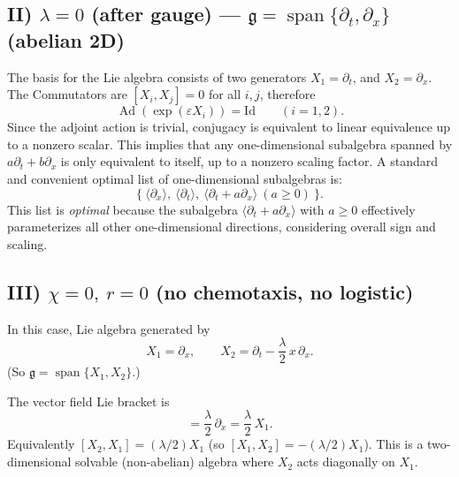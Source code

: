 \documentclass{article}
\begin{document}
\subsection*{II)  $\lambda=0$ (after gauge) — $\mathfrak g=\operatorname{span}\{\partial_t,\partial_x\}$ (abelian 2D)}
The basis for the Lie algebra consists of two generators $X_1=\partial_t$, and $X_2=\partial_x$. The Commutators are $[X_i,X_j]=0$ for all $i,j$, therefore
\begin{equation*}
\operatorname{Ad}(\exp(\varepsilon X_i))=\mathrm{Id}\qquad(i=1,2).
\end{equation*}
Since the adjoint action is trivial, conjugacy is equivalent to linear equivalence up to a nonzero scalar. This implies that any one-dimensional subalgebra spanned by $a\partial_t+b\partial_x$ is only equivalent to itself, up to a nonzero scaling factor. A standard and convenient optimal list of one-dimensional subalgebras is:
\begin{equation*}
\{\ \langle\partial_x\rangle,\ \langle\partial_t\rangle,\ \langle\partial_t + a\partial_x\rangle\ (a\ge 0)\ \}.
\end{equation*}
This list is \textit{optimal} because the subalgebra $\langle\partial_t + a\partial_x\rangle$ with $a\ge0$ effectively parameterizes all other one-dimensional directions, considering overall sign and scaling.
\par 
\subsection*{III) $\chi=0,\ r=0$ (no chemotaxis, no logistic)}
In this case, Lie algebra generated by
\begin{equation*}
X_1=\partial_x,\qquad X_2=\partial_t - \frac{\lambda}{2}\,x\,\partial_x.
\end{equation*}
(So $\mathfrak g=\operatorname{span}\{X_1,X_2\}$.)
\par 
The vector field Lie bracket is
\begin{equation*}
[X_2,X_1] = \frac{\lambda}{2}\,\partial_x = \frac{\lambda}{2}\,X_1.
\end{equation*}
Equivalently $[X_2,X_1]=(\lambda/2)X_1$ (so $[X_1,X_2]=-(\lambda/2)X_1$). This is a two-dimensional solvable (non-abelian) algebra where $X_2$ acts diagonally on $X_1$.
\par
\end{document}
